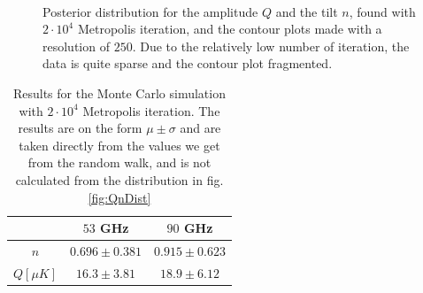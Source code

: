 \documentclass{emulateapj}
\begin{document}
\begin{figure}[t]
\centering
{}\\
\caption{Posterior distribution for the amplitude $Q$ and the tilt $n$, found with $2\cdot 10^4$ Metropolis iteration, and the contour plots made with a resolution of $250$. Due to the relatively low number of iteration, the data is quite sparse and the contour plot fragmented. }
\end{figure}

\begin{table}[t]
\centering
\begin{tabular}{c | c | c}
& $53$ GHz & $90$ GHz \\
\hline
$n$ & $0.696 \pm 0.381$ & $0.915 \pm 0.623$\\
$Q[\mu K]$ & $16.3 \pm 3.81$ & $18.9 \pm 6.12$
\end{tabular}
\caption{Results for the Monte Carlo simulation with $2\cdot 10^4$ Metropolis iteration. The results are on the form $\mu \pm \sigma$ and are taken directly from the values we get from the random walk, and is not calculated from the distribution in fig. \ref{fig:QnDist}}
\label{tab:results}
\end{table}
\end{document}
